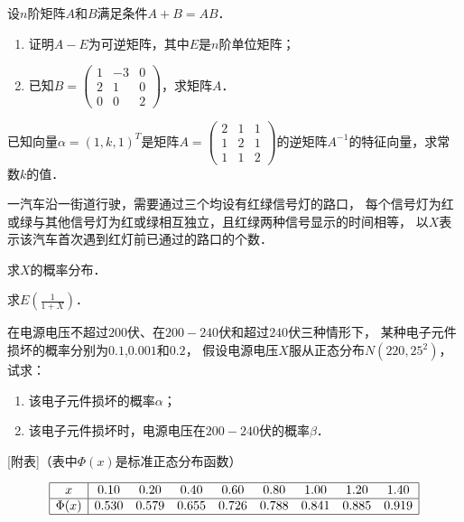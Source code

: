 \documentclass[plain,noanswer,medmath]{../../template/jnuexam}
\begin{document}

\begin{problem}
设$n$阶矩阵$A$和$B$满足条件$A + B = AB$．
\begin{enumerate}
\item 证明$A - E$为可逆矩阵，其中$E$是$n$阶单位矩阵；
\item 已知$B = \begin{pmatrix}
  1 & -3 & 0 \\
  2 &  1 & 0 \\
  0 &  0 & 2
\end{pmatrix}$，求矩阵$A$．
\end{enumerate}
\end{problem}



%



\begin{problem}
已知向量$\alpha =(1,k,1)^T$是矩阵$A = \begin{pmatrix}
  2 & 1 & 1 \\
  1 & 2 & 1 \\
  1 & 1 & 2
\end{pmatrix}$的逆矩阵$A^{-1}$的特征向量，求常数$k$的值．
\end{problem}



\begin{problem}
一汽车沿一街道行驶，需要通过三个均设有红绿信号灯的路口，
每个信号灯为红或绿与其他信号灯为红或绿相互独立，且红绿两种信号显示的时间相等，
以$X$表示该汽车首次遇到红灯前已通过的路口的个数．\par
\begin{enumerate*}
\item 求$X$的概率分布．
\item 求$E\left(\frac{1}{1 + X} \right)$．
\end{enumerate*}
\end{problem}



\begin{problem}
在电源电压不超过$200$伏、在$200 - 240$伏和超过$240$伏三种情形下，
某种电子元件损坏的概率分别为$0.1$,$0.001$和$0.2$，
假设电源电压$X$服从正态分布$N(220,25^2)$，试求：
\begin{enumerate}
\item 该电子元件损坏的概率$\alpha$；
\item 该电子元件损坏时，电源电压在$200 - 240$伏的概率$\beta$．
\end{enumerate}
\centerline{[附表]（表中$\Phi(x)$是标准正态分布函数）}\noindent
$$\begin{array}{|c|*{8}{c}|}
\hline
        x &  0.10 &  0.20 &  0.40 &  0.60 &  0.80 &  1.00 &  1.20 & 1.40 \\
\hline
  \Phi(x) & 0.530 & 0.579 & 0.655 & 0.726 & 0.788 & 0.841 & 0.885 & 0.919 \\
\hline
\end{array}$$
\end{problem}
\end{document}
